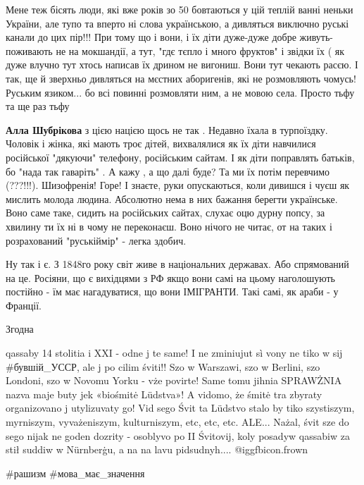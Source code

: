 \begin{itemize}

Мене теж бісять люди, які вже років зо 50 бовтаються у цій теплій ванні неньки
України, але тупо та вперто ні слова українською, а дивляться виключно руські
канали до цих пір!!! При тому що і вони, і їх діти дуже-дуже добре
живуть-поживають не на мокшандії, а тут, "гдє тєпло і много фруктов" і звідки
їх ( як дуже влучно тут хтось написав їх дрином не вигониш. Вони тут чекають
расєю. І так, ще й зверхньо дивляться на мєстних аборигенів, які не розмовляють
чомусь! Руським язиком... бо всі повинні розмовляти ним, а не мовою села.
Просто тьфу та ще раз тьфу

\begin{itemize} %
\textbf{Алла Шубрікова} з цією нацією щось не так . Недавно їхала в турпоїздку. Чоловік і жінка, які мають троє дітей, вихвалялися як їх діти навчилися російської "дякуючи" телефону, російським сайтам. І як діти поправлять батьків, бо "нада так гаваріть" . А кажу , а що далі буде? Та ми їх потім перевчимо (???!!!). Шизофренія! Горе! І знаєте, руки опускаються, коли дивишся і чуєш як мислить молода людина. Абсолютно нема в них бажання берегти українське. Воно саме таке, сидить на російських сайтах, слухає оцю дурну попсу, за хвилину ти їх ні в чому не переконаєш. Воно нічого не читає, от на таких і розрахований "руськіймір" - легка здобич.
\end{itemize} %

Ну так і є. З 1848го року світ живе в національних державах. Або спрямований на це. Росіяни, що є вихідцями з РФ якщо вони самі на цьому наголошують постійно - їм має нагадуватися, що вони ІМІГРАНТИ. Такі самі, як араби - у Франції.

Згодна


\obeycr
qassaby 14 stolitia i XXI - odne j te same!
I ne zminiujut sì vony ne tiko w sij \#бувшій\_УССР, ale j po cilim śviti!!
Szo w Warszawi, szo w Berlini, szo Londoni, szo w Novomu Yorku - vże povirte!
Same tomu jihnia SPRAWŻNIA nazva maje buty jek «biośmitė Lüdstva»!
A vidomo, że śmitė tra zbyraty organizovano j utylizuvaty go!
Vid sego Śvit ta Lüdstvo stalo by tiko szystiszym, myrniszym, vyvażeniszym, kulturniszym, etc, etc, etc.
ALE...
Nażal, śvit sze do sego nijak ne goden dozrity - osoblyvo po II Śvitovij,
koly posadyw qassabiw za stił suddiw w Nürnberġu,
a na na lavu pidsudnyh....  @igg{fbicon.frown} 
\restorecr

\#рашизм \#мова\_має\_значення


\end{itemize}
